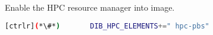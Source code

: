 
	Enable the HPC resource manager into image. 


\begin{lstlisting}[language=bash,keywords={}]
[ctrlr](*\#*)       DIB_HPC_ELEMENTS+=" hpc-pbs"
\end{lstlisting} 
